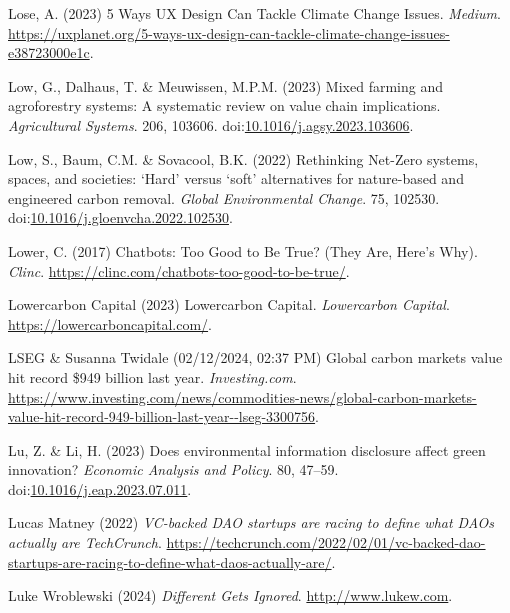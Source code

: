 \documentclass[
  letterpaper,
  DIV=11,
  numbers=noendperiod]{scrartcl}
\newlength{\cslhangindent}
\newenvironment{CSLReferences}[2] %
 {\begin{list}{}{%
  \setlength{\itemindent}{0pt}
  \setlength{\leftmargin}{0pt}
  \setlength{\parsep}{0pt}
  \ifodd #1
   \setlength{\leftmargin}{\cslhangindent}
   \setlength{\itemindent}{-1\cslhangindent}
  \fi
  \setlength{\itemsep}{#2\baselineskip}}}
 {\end{list}}
\begin{document}
\begin{CSLReferences}{0}{1}
Lose, A. (2023) 5 {Ways UX Design Can Tackle Climate Change Issues}.
\emph{Medium}.
\url{https://uxplanet.org/5-ways-ux-design-can-tackle-climate-change-issues-e38723000e1c}.

Low, G., Dalhaus, T. \& Meuwissen, M.P.M. (2023) Mixed farming and
agroforestry systems: {A} systematic review on value chain implications.
\emph{Agricultural Systems}. 206, 103606.
doi:\href{https://doi.org/10.1016/j.agsy.2023.103606}{10.1016/j.agsy.2023.103606}.

Low, S., Baum, C.M. \& Sovacool, B.K. (2022) Rethinking {Net-Zero}
systems, spaces, and societies: {`{Hard}'} versus {`soft'} alternatives
for nature-based and engineered carbon removal. \emph{Global
Environmental Change}. 75, 102530.
doi:\href{https://doi.org/10.1016/j.gloenvcha.2022.102530}{10.1016/j.gloenvcha.2022.102530}.

Lower, C. (2017) Chatbots: {Too Good} to {Be True}? ({They Are},
{Here}'s {Why}). \emph{Clinc}.
\url{https://clinc.com/chatbots-too-good-to-be-true/}.

Lowercarbon Capital (2023) Lowercarbon {Capital}. \emph{Lowercarbon
Capital}. \url{https://lowercarboncapital.com/}.

LSEG \& Susanna Twidale (02/12/2024, 02:37 PM) Global carbon markets
value hit record \$949 billion last year. \emph{Investing.com}.
\url{https://www.investing.com/news/commodities-news/global-carbon-markets-value-hit-record-949-billion-last-year--lseg-3300756}.

Lu, Z. \& Li, H. (2023) Does environmental information disclosure affect
green innovation? \emph{Economic Analysis and Policy}. 80, 47--59.
doi:\href{https://doi.org/10.1016/j.eap.2023.07.011}{10.1016/j.eap.2023.07.011}.

Lucas Matney (2022) \emph{{VC-backed DAO} startups are racing to define
what {DAOs} actually are {\textbar} {TechCrunch}}.
\url{https://techcrunch.com/2022/02/01/vc-backed-dao-startups-are-racing-to-define-what-daos-actually-are/}.

Luke Wroblewski (2024) \emph{Different {Gets Ignored}}.
\url{http://www.lukew.com}.


\end{CSLReferences}
\end{document}
